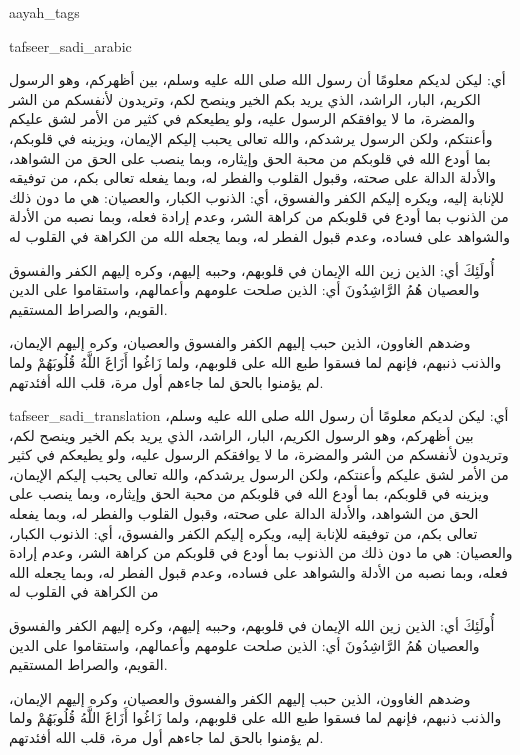 \begin{taggedblock}{aayah_tags}
\end{taggedblock}
\begin{taggedblock}{tafseer_sadi_arabic}
\begin{Arabic}
أي: ليكن لديكم معلومًا أن رسول الله صلى الله عليه وسلم، بين أظهركم، وهو الرسول الكريم، البار، الراشد، الذي يريد بكم الخير وينصح لكم، وتريدون لأنفسكم من الشر والمضرة، ما لا يوافقكم الرسول عليه، ولو يطيعكم في كثير من الأمر لشق عليكم وأعنتكم، ولكن الرسول يرشدكم، والله تعالى يحبب إليكم الإيمان، ويزينه في قلوبكم، بما أودع الله في قلوبكم من محبة الحق وإيثاره، وبما ينصب على الحق من الشواهد، والأدلة الدالة على صحته، وقبول القلوب والفطر له، وبما يفعله تعالى بكم، من توفيقه للإنابة إليه، ويكره إليكم الكفر والفسوق، أي: الذنوب الكبار، والعصيان: هي ما دون ذلك من الذنوب  بما أودع في قلوبكم من كراهة الشر، وعدم إرادة فعله، وبما نصبه من الأدلة والشواهد على فساده، وعدم قبول الفطر له، وبما يجعله الله من الكراهة في القلوب له

{ أُولَئِكَ }
أي: الذين زين الله الإيمان في قلوبهم، وحببه إليهم، وكره إليهم الكفر والفسوق والعصيان
{ هُمُ الرَّاشِدُونَ }
أي: الذين صلحت علومهم وأعمالهم، واستقاموا على الدين القويم، والصراط المستقيم.

وضدهم الغاوون، الذين حبب إليهم الكفر والفسوق والعصيان، وكره إليهم الإيمان، والذنب ذنبهم، فإنهم لما فسقوا طبع الله على قلوبهم، ولما
{ زَاغُوا أَزَاغَ اللَّهُ قُلُوبَهُمْ }
ولما لم يؤمنوا بالحق لما جاءهم أول مرة، قلب الله أفئدتهم.
\end{Arabic}
\end{taggedblock}
\begin{taggedblock}{tafseer_sadi_translation}
أي: ليكن لديكم معلومًا أن رسول الله صلى الله عليه وسلم، بين أظهركم، وهو الرسول الكريم، البار، الراشد، الذي يريد بكم الخير وينصح لكم، وتريدون لأنفسكم من الشر والمضرة، ما لا يوافقكم الرسول عليه، ولو يطيعكم في كثير من الأمر لشق عليكم وأعنتكم، ولكن الرسول يرشدكم، والله تعالى يحبب إليكم الإيمان، ويزينه في قلوبكم، بما أودع الله في قلوبكم من محبة الحق وإيثاره، وبما ينصب على الحق من الشواهد، والأدلة الدالة على صحته، وقبول القلوب والفطر له، وبما يفعله تعالى بكم، من توفيقه للإنابة إليه، ويكره إليكم الكفر والفسوق، أي: الذنوب الكبار، والعصيان: هي ما دون ذلك من الذنوب  بما أودع في قلوبكم من كراهة الشر، وعدم إرادة فعله، وبما نصبه من الأدلة والشواهد على فساده، وعدم قبول الفطر له، وبما يجعله الله من الكراهة في القلوب له

{ أُولَئِكَ }
أي: الذين زين الله الإيمان في قلوبهم، وحببه إليهم، وكره إليهم الكفر والفسوق والعصيان
{ هُمُ الرَّاشِدُونَ }
أي: الذين صلحت علومهم وأعمالهم، واستقاموا على الدين القويم، والصراط المستقيم.

وضدهم الغاوون، الذين حبب إليهم الكفر والفسوق والعصيان، وكره إليهم الإيمان، والذنب ذنبهم، فإنهم لما فسقوا طبع الله على قلوبهم، ولما
{ زَاغُوا أَزَاغَ اللَّهُ قُلُوبَهُمْ }
ولما لم يؤمنوا بالحق لما جاءهم أول مرة، قلب الله أفئدتهم.
\end{taggedblock}
